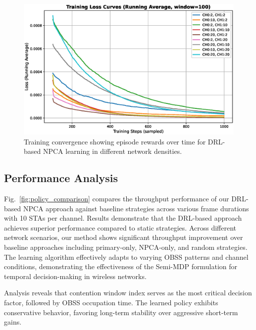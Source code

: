 \documentclass[conference]{IEEEtran}
\begin{document}
\begin{figure}
\centerline{\includegraphics[width=\columnwidth]{figure/loss_curves_ax7.eps}}
\caption{Training convergence showing episode rewards over time for DRL-based NPCA learning in different network densities.}
\label{fig:training_convergence}
\end{figure}

\subsection{Performance Analysis}

Fig.~\ref{fig:policy_comparison} compares the throughput performance of our DRL-based NPCA approach against baseline strategies across various frame durations with 10 STAs per channel. Results demonstrate that the DRL-based approach achieves superior performance compared to static strategies. Across different network scenarios, our method shows significant throughput improvement over baseline approaches including primary-only, NPCA-only, and random strategies. The learning algorithm effectively adapts to varying OBSS patterns and channel conditions, demonstrating the effectiveness of the Semi-MDP formulation for temporal decision-making in wireless networks.

Analysis reveals that contention window index serves as the most critical decision factor, followed by OBSS occupation time. The learned policy exhibits conservative behavior, favoring long-term stability over aggressive short-term gains.
\end{document}
